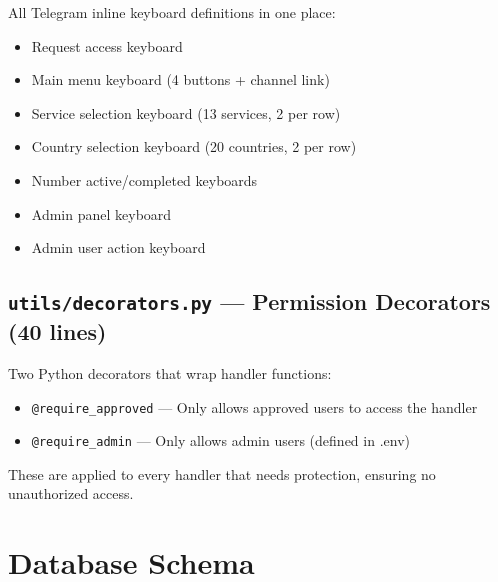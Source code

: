 All Telegram inline keyboard definitions in one place:
\begin{itemize}
    \item Request access keyboard
    \item Main menu keyboard (4 buttons + channel link)
    \item Service selection keyboard (13 services, 2 per row)
    \item Country selection keyboard (20 countries, 2 per row)
    \item Number active/completed keyboards
    \item Admin panel keyboard
    \item Admin user action keyboard
\end{itemize}

\subsection{\texttt{utils/decorators.py} --- Permission Decorators (40 lines)}

Two Python decorators that wrap handler functions:
\begin{itemize}
    \item \texttt{@require\_approved} --- Only allows approved users to access the handler
    \item \texttt{@require\_admin} --- Only allows admin users (defined in .env)
\end{itemize}

These are applied to every handler that needs protection, ensuring no unauthorized access.

\section{Database Schema}

